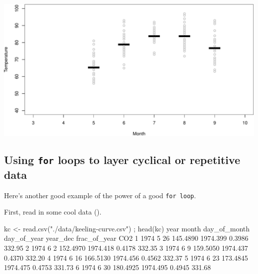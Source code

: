 \documentclass[
]{book}
\newenvironment{Shaded}{\begin{snugshade}}{\end{snugshade}}
\newcommand{\DecValTok}[1]{\textcolor[rgb]{0.00,0.00,0.81}{#1}}
\newcommand{\FloatTok}[1]{\textcolor[rgb]{0.00,0.00,0.81}{#1}}
\newcommand{\FunctionTok}[1]{\textcolor[rgb]{0.00,0.00,0.00}{#1}}
\newcommand{\NormalTok}[1]{#1}
\newcommand{\OtherTok}[1]{\textcolor[rgb]{0.56,0.35,0.01}{#1}}
\newcommand{\StringTok}[1]{\textcolor[rgb]{0.31,0.60,0.02}{#1}}
\begin{document}
\includegraphics{figures/unnamed-chunk-311-1.pdf}

\hypertarget{using-for-loops-to-layer-cyclical-or-repetitive-data}{%
\subsection*{\texorpdfstring{Using \texttt{for} loops to layer cyclical or repetitive data}{Using for loops to layer cyclical or repetitive data}}\label{using-for-loops-to-layer-cyclical-or-repetitive-data}}

Here's another good example of the power of a good \texttt{for\ loop}.

First, read in some cool data ().

\begin{Shaded}
\begin{Highlighting}[]
\NormalTok{kc }\OtherTok{\textless{}{-}} \FunctionTok{read.csv}\NormalTok{(}\StringTok{"./data/keeling{-}curve.csv"}\NormalTok{) ; }\FunctionTok{head}\NormalTok{(kc)}
\NormalTok{  year month day\_of\_month day\_of\_year year\_dec frac\_of\_year    CO2}
\DecValTok{1} \DecValTok{1974}     \DecValTok{5}           \DecValTok{26}    \FloatTok{145.4890} \FloatTok{1974.399}       \FloatTok{0.3986} \FloatTok{332.95}
\DecValTok{2} \DecValTok{1974}     \DecValTok{6}            \DecValTok{2}    \FloatTok{152.4970} \FloatTok{1974.418}       \FloatTok{0.4178} \FloatTok{332.35}
\DecValTok{3} \DecValTok{1974}     \DecValTok{6}            \DecValTok{9}    \FloatTok{159.5050} \FloatTok{1974.437}       \FloatTok{0.4370} \FloatTok{332.20}
\DecValTok{4} \DecValTok{1974}     \DecValTok{6}           \DecValTok{16}    \FloatTok{166.5130} \FloatTok{1974.456}       \FloatTok{0.4562} \FloatTok{332.37}
\DecValTok{5} \DecValTok{1974}     \DecValTok{6}           \DecValTok{23}    \FloatTok{173.4845} \FloatTok{1974.475}       \FloatTok{0.4753} \FloatTok{331.73}
\DecValTok{6} \DecValTok{1974}     \DecValTok{6}           \DecValTok{30}    \FloatTok{180.4925} \FloatTok{1974.495}       \FloatTok{0.4945} \FloatTok{331.68}
\end{Highlighting}
\end{Shaded}
\end{document}
